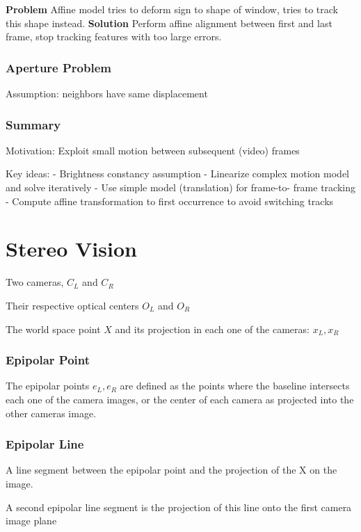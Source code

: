 \textbf{Problem}  Affine model tries to deform sign to shape of window, tries to track this shape instead. 
\textbf{Solution} Perform affine alignment between first and last frame, stop tracking features with too large errors. 

\subsubsection{Aperture Problem}

Assumption: neighbors have same displacement

\subsubsection{Summary}
Motivation: Exploit small motion between subsequent (video) frames

Key ideas:
- Brightness constancy assumption
- Linearize complex motion model and solve iteratively
- Use simple model (translation) for frame-to- frame tracking
- Compute affine transformation to first occurrence to avoid switching tracks


\section{Stereo Vision}

Two cameras, $C_L$ and $C_R$

Their respective optical centers $O_L$ and $O_R$

The world space point $X$ and its projection in each one of the cameras: $x_L, x_R$

\subsubsection{Epipolar Point}

The epipolar points $e_L, e_R$ are defined as the points where the baseline intersects each one of the camera images, or the center of each camera as projected into the other cameras image.

\subsubsection{Epipolar Line}

A line segment between the epipolar point and the projection of the X on the image.

A second epipolar line segment is the projection of this line onto the first camera image plane

